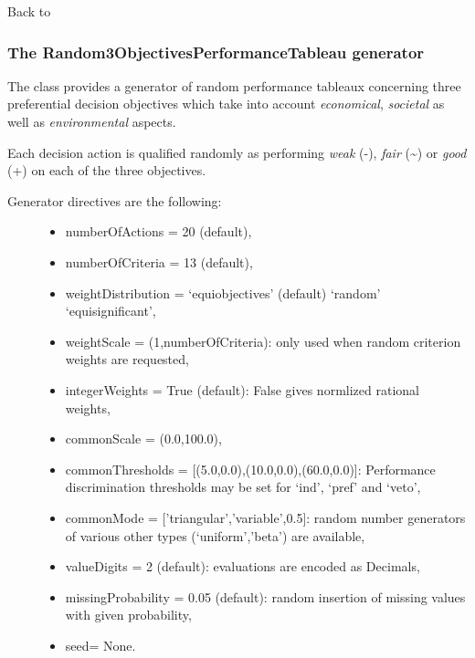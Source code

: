 \documentclass[letterpaper,10pt,english]{sphinxmanual}
\begin{document}
Back to {\hyperref[tutorial:tutorial-label]{\emph{}}}


\subsubsection{The Random3ObjectivesPerformanceTableau generator}
\label{tutorial:the-random3objectivesperformancetableau-generator}
The class provides a generator of random performance tableaux concerning three preferential decision objectives which take into account \emph{economical}, \emph{societal} as well as \emph{environmental} aspects.

Each decision action is qualified randomly as performing \emph{weak} (-), \emph{fair} (\textasciitilde{}) or \emph{good} (+) on each of the three objectives.
\begin{description}
\item[{Generator directives are the following:}] \leavevmode\begin{itemize}
\item {} 
numberOfActions = 20 (default),

\item {} 
numberOfCriteria = 13 (default),

\item {} 
weightDistribution = `equiobjectives' (default) \textbar{} `random' \textbar{} `equisignificant',

\item {} 
weightScale = (1,numberOfCriteria): only used when random criterion weights are requested,

\item {} 
integerWeights = True (default): False gives normlized rational weights,

\item {} 
commonScale = (0.0,100.0),

\item {} 
commonThresholds = {[}(5.0,0.0),(10.0,0.0),(60.0,0.0){]}: Performance discrimination thresholds may be set for `ind', `pref' and `veto',

\item {} 
commonMode = {[}'triangular','variable',0.5{]}: random number generators of various other types (`uniform','beta') are available,

\item {} 
valueDigits = 2 (default): evaluations are encoded as Decimals,

\item {} 
missingProbability = 0.05 (default): random insertion of missing values with given probability,

\item {} 
seed= None.

\end{itemize}

\end{description}
\end{document}

